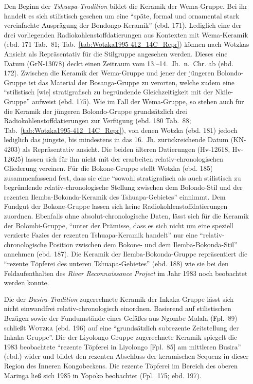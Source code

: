 Den Beginn der \textit{Tshuapa-Tradition} bildet die Keramik der Wema-Gruppe. Bei ihr handelt es sich stilistisch gesehen um eine \enquote{späte, formal und ornamental stark vereinfachte Ausprägung der Bondongo-Keramik} (ebd. 171). Lediglich eine der drei vorliegenden Radiokohlenstoffdatierungen aus Kontexten mit Wema-Keramik (ebd. 171 Tab.~81; Tab.~\ref{tab:Wotzka1995-412_14C_Repr}) können nach Wotzkas Ansicht als Repräsentativ für die Stilgruppe angesehen werden. Dieses eine Datum (GrN-13078) deckt einen Zeitraum vom 13.--14.~Jh.~n.~Chr. ab (ebd. 172). Zwischen die Keramik der Wema-Gruppe und jener der jüngeren Bolondo-Gruppe ist das Material der Bosanga-Gruppe zu verorten, welche zudem eine \enquote{stilistisch [wie] stratigrafisch zu begründende Gleichzeitigkeit mit der Nkile-Gruppe} aufweist (ebd. 175). Wie im Fall der Wema-Gruppe, so stehen auch für die Keramik der jüngeren Bolondo-Gruppe grundsätzlich drei Radiokohlenstoffdatierungen zur Verfügung (ebd. 180 Tab.~88; Tab.~\ref{tab:Wotzka1995-412_14C_Repr}), von denen Wotzka (ebd. 181) jedoch lediglich das jüngste, bis mindestens in das 16.~Jh. zurückreichende Datum (KN-4203) als Repräsentativ ansieht. Die beiden älteren Datierungen (Hv-12618, Hv-12625) lassen sich für ihn nicht mit der erarbeiten relativ-chronologischen Gliederung vereinen. Für die Bokone-Gruppe stellt Wotzka (ebd. 185) zusammenfassend fest, dass sie eine \enquote{sowohl stratigrafisch als auch stilistisch zu begründende relativ-chronologische Stellung zwischen dem Bolondo-Stil und der rezenten Ilemba-Bokonda-Keramik des Tshuapa-Gebietes} einnimmt. Dem Fundgut der Bokone-Gruppe lassen sich keine Radiokohlenstoffdatierungen zuordnen. Ebenfalls ohne absolut-chronologische Daten, lässt sich für die Keramik der Bolombi-Gruppe, \enquote{unter der Prämisse, dass es sich nicht um eine speziell verzierte Fazies der rezenten Tshuapa-Keramik handelt} nur eine \enquote{relativ-chronologische Position zwischen dem Bokone- und dem Ilemba-Bokonda-Stil} annehmen (ebd. 187). Die Keramik der Ilemba-Bokonda-Gruppe repräsentiert die \enquote{rezente Töpferei des unteren Tshuapa-Gebietes} (ebd. 188) wie sie bei den Feldaufenthalten des \textit{River Reconnaissance Project} im Jahr 1983 noch beobachtet werden konnte.

Die der \textit{Busira-Tradition} zugerechnete Keramik der Inkaka-Gruppe lässt sich nicht einwandfrei relativ-chronologisch einordnen. Basierend auf stilistischen Bezügen sowie der Fundumstände eines Gefäßes aus Ngombe-Malala (Fpl.~89) schließt \textsc{Wotzka} (ebd. 196) auf eine \enquote{grundsätzlich subrezente Zeitstellung der Inkaka-Gruppe}. Die der Liyolongo-Gruppe zugerechnete Keramik spiegelt die 1983 beobachtete \enquote{rezente Töpferei in Liyolongo [Fpl.~85] am mittleren Busira} (ebd.) wider und bildet den rezenten Abschluss der keramischen Sequenz in \linebreak\clearpage\noindent dieser Region des Inneren Kongobeckens. Die rezente Töpferei im Bereich des oberen Maringa ließ sich 1985 in Yopoko beobachtet (Fpl.~175; ebd. 197). 

